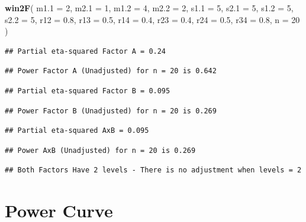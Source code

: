 \documentclass[]{book}
\newenvironment{Shaded}{\begin{snugshade}}{\end{snugshade}}
\newcommand{\DataTypeTok}[1]{\textcolor[rgb]{0.13,0.29,0.53}{#1}}
\newcommand{\DecValTok}[1]{\textcolor[rgb]{0.00,0.00,0.81}{#1}}
\newcommand{\FloatTok}[1]{\textcolor[rgb]{0.00,0.00,0.81}{#1}}
\newcommand{\KeywordTok}[1]{\textcolor[rgb]{0.13,0.29,0.53}{\textbf{#1}}}
\newcommand{\NormalTok}[1]{#1}
\begin{document}
\begin{Shaded}
\begin{Highlighting}[]
\KeywordTok{win2F}\NormalTok{(}
  \DataTypeTok{m1.1 =} \DecValTok{2}\NormalTok{,}
  \DataTypeTok{m2.1 =} \DecValTok{1}\NormalTok{,}
  \DataTypeTok{m1.2 =} \DecValTok{4}\NormalTok{,}
  \DataTypeTok{m2.2 =} \DecValTok{2}\NormalTok{,}
  \DataTypeTok{s1.1 =} \DecValTok{5}\NormalTok{,}
  \DataTypeTok{s2.1 =} \DecValTok{5}\NormalTok{,}
  \DataTypeTok{s1.2 =} \DecValTok{5}\NormalTok{,}
  \DataTypeTok{s2.2 =} \DecValTok{5}\NormalTok{,}
  \DataTypeTok{r12 =} \FloatTok{0.8}\NormalTok{,}
  \DataTypeTok{r13 =} \FloatTok{0.5}\NormalTok{,}
  \DataTypeTok{r14 =} \FloatTok{0.4}\NormalTok{,}
  \DataTypeTok{r23 =} \FloatTok{0.4}\NormalTok{,}
  \DataTypeTok{r24 =} \FloatTok{0.5}\NormalTok{,}
  \DataTypeTok{r34 =} \FloatTok{0.8}\NormalTok{,}
  \DataTypeTok{n =} \DecValTok{20}
\NormalTok{)}
\end{Highlighting}
\end{Shaded}

\begin{verbatim}
## Partial eta-squared Factor A = 0.24
\end{verbatim}

\begin{verbatim}
## Power Factor A (Unadjusted) for n = 20 is 0.642
\end{verbatim}

\begin{verbatim}
## Partial eta-squared Factor B = 0.095
\end{verbatim}

\begin{verbatim}
## Power Factor B (Unadjusted) for n = 20 is 0.269
\end{verbatim}

\begin{verbatim}
## Partial eta-squared AxB = 0.095
\end{verbatim}

\begin{verbatim}
## Power AxB (Unadjusted) for n = 20 is 0.269
\end{verbatim}

\begin{verbatim}
## Both Factors Have 2 levels - There is no adjustment when levels = 2
\end{verbatim}

\hypertarget{power-curve}{%
\chapter{Power Curve}\label{power-curve}}
\end{document}
